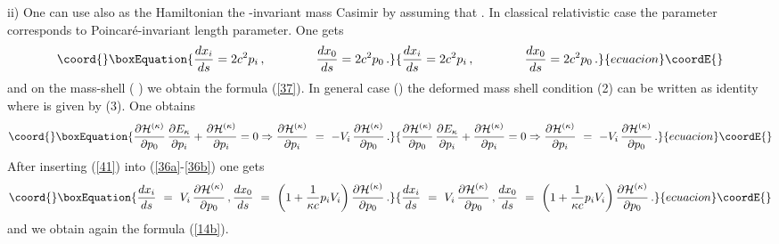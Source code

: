 \documentclass[a4paper,12pt]{article}
\begin{document}
ii) One can use also as the Hamiltonian \coordHE{} the
\myHighlight{$\kappa$}\coordHE{}-invariant mass Casimir  by assuming that \coordHE{}. In classical relativistic case \coordHE{} the parameter \coordHE{}
 corresponds to Poincar\'{e}-invariant length parameter. One gets
\begin{equation}\coord{}\boxEquation{\label{40}
\frac{dx_i}{ds}= 2 c^2 p_i \, , \qquad \qquad \frac{dx_0}{ds}= 2
c^2 p_0 \, .
}{\frac{dx_i}{ds}= 2 c^2 p_i \, , \qquad \qquad \frac{dx_0}{ds}= 2
c^2 p_0 \, .
}{ecuacion}\coordE{}\end{equation}
and on the mass-shell ( \coordHE{}) we obtain the formula (\ref{37}). In general case (\myHighlight{$\kappa \leq
\infty $}\coordHE{}) the deformed mass shell condition (2) can be written as
identity \coordHE{} where \coordHE{} is given by (3). One obtains
\begin{equation}\coord{}\boxEquation{\label{41}
\frac{\partial {\cal H}^{(\kappa)}}{\partial p_0} \,
\frac{\partial { E}_{\kappa}}{\partial p_i} + \frac{\partial {\cal
H}^{(\kappa)}}{\partial p_i} = 0 \Rightarrow \frac{\partial {\cal
H }^{(\kappa)}}{\partial p_i} \ = \ - V_i\, \frac{\partial {\cal
H}^{(\kappa)}}{\partial p_0} \, .
}{\frac{\partial {\cal H}^{(\kappa)}}{\partial p_0} \,
\frac{\partial { E}_{\kappa}}{\partial p_i} + \frac{\partial {\cal
H}^{(\kappa)}}{\partial p_i} = 0 \Rightarrow \frac{\partial {\cal
H }^{(\kappa)}}{\partial p_i} \ = \ - V_i\, \frac{\partial {\cal
H}^{(\kappa)}}{\partial p_0} \, .
}{ecuacion}\coordE{}\end{equation}
After inserting (\ref{41}) into (\ref{36a}-\ref{36b}) one gets
\begin{equation}\coord{}\boxEquation{\label{42}
\frac{dx_i}{ds} \ = \ V_i\,\frac{\partial {\cal
H}^{(\kappa)}}{\partial p_0}\, , \frac{dx_0}{ds} \ = \ \left(1 +
\frac{1}{\kappa c} p_i V_i\right)\frac{\partial {\cal
H}^{(\kappa)}}{\partial p_0} \, .
}{\frac{dx_i}{ds} \ = \ V_i\,\frac{\partial {\cal
H}^{(\kappa)}}{\partial p_0}\, , \frac{dx_0}{ds} \ = \ \left(1 +
\frac{1}{\kappa c} p_i V_i\right)\frac{\partial {\cal
H}^{(\kappa)}}{\partial p_0} \, .
}{ecuacion}\coordE{}\end{equation}
and we obtain again the formula (\ref{14b}).
\end{document}
